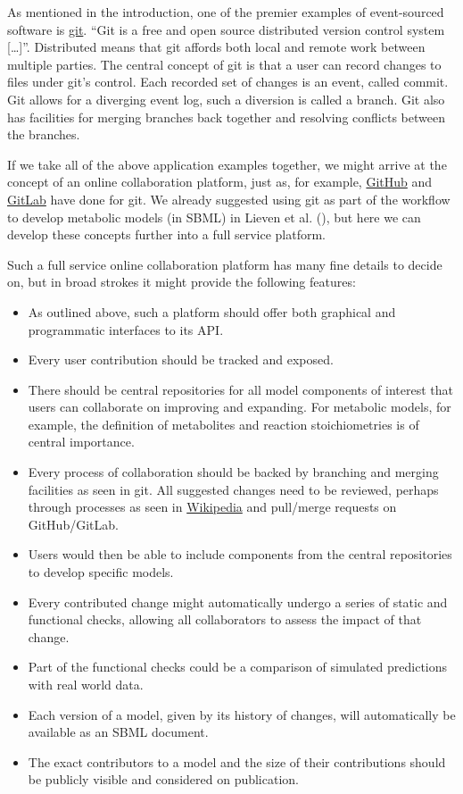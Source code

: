 \documentclass[
  a4paper,
]{scrartcl}
\providecommand{\tightlist}{%
  \setlength{\itemsep}{0pt}\setlength{\parskip}{0pt}}
\begin{document}
As mentioned in the introduction, one of the premier examples of
event-sourced software is \href{https://git-scm.com/}{git}. ``Git is a
free and open source distributed version control system {[}\ldots{]}''.
Distributed means that git affords both local and remote work between
multiple parties. The central concept of git is that a user can record
changes to files under git's control. Each recorded set of changes is an
event, called commit. Git allows for a diverging event log, such a
diversion is called a branch. Git also has facilities for merging
branches back together and resolving conflicts between the branches.

If we take all of the above application examples together, we might
arrive at the concept of an online collaboration platform, just as, for
example, \href{https://github.com/}{GitHub} and
\href{https://gitlab.com/}{GitLab} have done for git. We already
suggested using git as part of the workflow to develop metabolic models
(in SBML) in Lieven et al. (),
but here we can develop these concepts further into a full service
platform.

Such a full service online collaboration platform has many fine details
to decide on, but in broad strokes it might provide the following
features:

\begin{itemize}
\tightlist
\item
  As outlined above, such a platform should offer both graphical and
  programmatic interfaces to its API.
\item
  Every user contribution should be tracked and exposed.
\item
  There should be central repositories for all model components of
  interest that users can collaborate on improving and expanding. For
  metabolic models, for example, the definition of metabolites and
  reaction stoichiometries is of central importance.
\item
  Every process of collaboration should be backed by branching and
  merging facilities as seen in git. All suggested changes need to be
  reviewed, perhaps through processes as seen in
  \href{https://www.wikipedia.org/}{Wikipedia} and pull/merge requests
  on GitHub/GitLab.
\item
  Users would then be able to include components from the central
  repositories to develop specific models.
\item
  Every contributed change might automatically undergo a series of
  static and functional checks, allowing all collaborators to assess the
  impact of that change.
\item
  Part of the functional checks could be a comparison of simulated
  predictions with real world data.
\item
  Each version of a model, given by its history of changes, will
  automatically be available as an SBML document.
\item
  The exact contributors to a model and the size of their contributions
  should be publicly visible and considered on publication.
\end{itemize}
\end{document}
